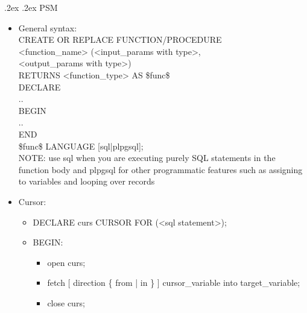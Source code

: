 \documentclass[10pt,landscape,a4paper]{scrartcl}
\makeatletter
\renewcommand{\section}{\@startsection{section}{1}{0mm}%
  {.2ex}%
  {.2ex}%
{\color{myblue}\sffamily\small\bfseries}}
\makeatother
\begin{document}
\begin{multicols*}{4}
  \section{PSM}
    \begin{itemize}
      \item General syntax: \\
         CREATE OR REPLACE FUNCTION/PROCEDURE \\ <function\_name> (<input\_params with type>, \\
         <output\_params with type>) \\
         RETURNS <function\_type> AS \$func\$ \\
         DECLARE \\
         .. \\
         BEGIN \\
         .. \\
         END \\
         \$func\$ LANGUAGE [sql|plpgsql]; \\
     NOTE: use sql when you are executing purely SQL statements in the function body and plpgsql for other programmatic features such as assigning to variables and looping over records
     \item Cursor:
       \begin{itemize}
       \item DECLARE curs CURSOR FOR (<sql statement>);
       \item BEGIN:
         \begin{itemize}
              \item open curs;
              \item fetch [ direction \{ from | in \} ] cursor\_variable into target\_variable;
              \item close curs;
         \end{itemize}
      \end{itemize}
   \end{itemize}

\end{multicols*}
\end{document}
